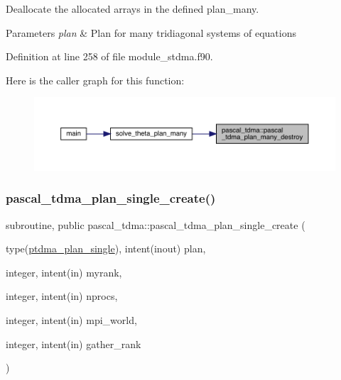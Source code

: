 Deallocate the allocated arrays in the defined plan\+\_\+many. 


\begin{DoxyParams}{Parameters}
{\em plan} & Plan for many tridiagonal systems of equations \\
\hline
\end{DoxyParams}


Definition at line 258 of file module\+\_\+stdma.\+f90.

Here is the caller graph for this function\+:
\nopagebreak
\begin{figure}[H]
\begin{center}
\leavevmode
\includegraphics[width=350pt]{namespacepascal__tdma_a8438e6774617871b147af9ec8bdad6ce_icgraph}
\end{center}
\end{figure}
\mbox{\label{namespacepascal__tdma_a5dfc2d7c919b47ad364a74d141532a9f}} 
\subsubsection{\texorpdfstring{pascal\_tdma\_plan\_single\_create()}{pascal\_tdma\_plan\_single\_create()}}
{\footnotesize\ttfamily subroutine, public pascal\+\_\+tdma\+::pascal\+\_\+tdma\+\_\+plan\+\_\+single\+\_\+create (\begin{DoxyParamCaption}\item[{type(\mbox{\hyperlink{structpascal__tdma_1_1ptdma__plan__single}{ptdma\+\_\+plan\+\_\+single}}), intent(inout)}]{plan,  }\item[{integer, intent(in)}]{myrank,  }\item[{integer, intent(in)}]{nprocs,  }\item[{integer, intent(in)}]{mpi\+\_\+world,  }\item[{integer, intent(in)}]{gather\+\_\+rank }\end{DoxyParamCaption})}



